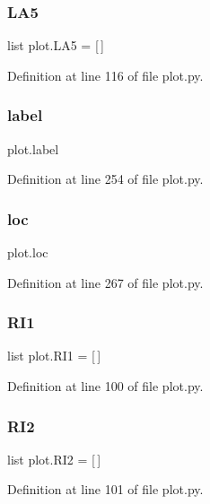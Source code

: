 \subsubsection{L\+A5}
{\footnotesize\ttfamily list plot.\+L\+A5 = [$\,$]}



Definition at line 116 of file plot.\+py.

\mbox{\label{namespaceplot_ab833ccc4e4fb7e634ddb35e4eb25c59d}} 
\subsubsection{label}
{\footnotesize\ttfamily plot.\+label}



Definition at line 254 of file plot.\+py.

\mbox{\label{namespaceplot_ab498c44b7a7bd580f184bac89e46f3d9}} 
\subsubsection{loc}
{\footnotesize\ttfamily plot.\+loc}



Definition at line 267 of file plot.\+py.

\mbox{\label{namespaceplot_a92c5bd40fb2c7fd005124da6c9099fa9}} 
\subsubsection{R\+I1}
{\footnotesize\ttfamily list plot.\+R\+I1 = [$\,$]}



Definition at line 100 of file plot.\+py.

\mbox{\label{namespaceplot_a9f65ef5ac3d73165152f25e7544ba8dd}} 
\subsubsection{R\+I2}
{\footnotesize\ttfamily list plot.\+R\+I2 = [$\,$]}



Definition at line 101 of file plot.\+py.

\mbox{\label{namespaceplot_a47c7ca18e5886fe73779a20323e35583}} 
